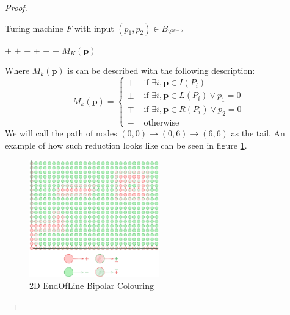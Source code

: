 \begin{proof}
    \begin{algorithm}
        \caption{Turing machine $F$ with input $(p_1, p_2) \in B_{2^{2k+5}}$}
        \begin{algorithmic}
            \State \Return $+$
            \Else
            \State \Return $\pm$
            \EndIf
            \State \Return $+$
            \State \Return $\mp$
            \State \Return $\pm$
            \Else
            \State \Return $-$
            \EndIf
            \Else
            \State \Return $M_K(\mathbf{p})$
            \EndIf
        \end{algorithmic}
    \end{algorithm}

    Where $M_{k}(\mathbf{p})$ is can be described with the following description:
    $$
        M_{k}(\mathbf{p})  =\begin{cases}
            +   & \text{ if } \exists i, \mathbf{p} \in I(P_{i})                \\
            \pm & \text{ if }\exists i, \mathbf{p} \in L(P_{i}) \vee p_{1} = 0  \\
            \mp & \text{ if } \exists i, \mathbf{p} \in R(P_{i}) \vee p_{2} = 0 \\
            -   & \text{ otherwise}
        \end{cases}
    $$
    We will call the path of nodes $(0,0) \to (0,6) \to(6,6)$ as the tail.
    An example of how such reduction looks like can be seen in figure \ref{fig:chap-3:eol-sperner-colouring}.
    \begin{figure}[h!]
        \centering
        \includegraphics[width=0.5\textwidth]{Chapter3/2d-sperner-eol.pdf}
        \caption{2D EndOfLine Bipolar Colouring}
        \label{fig:chap-3:eol-sperner-colouring}
    \end{figure}



\end{proof}

